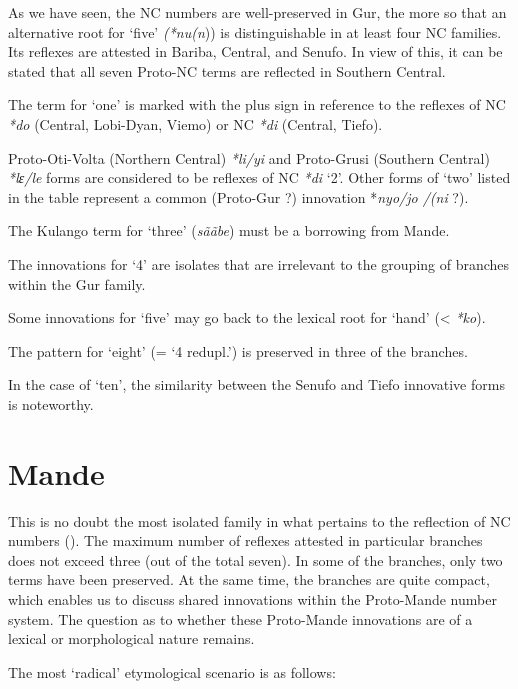 As we have seen, the NC numbers are well-preserved in Gur, the more so that an alternative root for ‘five’ \textit{(*nu}\textit{(n})) is distinguishable in at least four NC families. Its reflexes are attested in Bariba, Central, and Senufo. In view of this, it can be stated that all seven Proto-NC terms are reflected in Southern Central. 

The term for ‘one’ is marked with the plus sign in reference to the reflexes of NC \textit{*do} (Central, Lobi-Dyan, Viemo) or NC \textit{*di} (Central, Tiefo).

Proto-Oti-Volta (Northern Central) \textit{*li/yi} and Proto-Grusi (Southern Central) \textit{*lɛ/le} forms are considered to be reflexes of NC \textit{*di} ‘2’. Other forms of ‘two’ listed in the table represent a common (Proto-Gur ?) innovation  *\textit{nyo/jo /(ni} ?).

\largerpage[2]
The Kulango term for ‘three’ (\textit{s{\~{a}}{\~{a}}be}) must be a borrowing from Mande.

The innovations for ‘4’ are isolates that are irrelevant to the grouping of branches within the Gur family. 

Some innovations for ‘five’ may go back to the lexical root for ‘hand’ (< \textit{*ko}).

The pattern for ‘eight’ (= ‘4 redupl.’) is preserved in three of the branches.

In the case of ‘ten’, the similarity between the Senufo and Tiefo innovative forms is noteworthy.




\section{Mande}%

This is no doubt the most isolated family in what pertains to the reflection of NC numbers (). The maximum number of reflexes attested in particular branches does not exceed three (out of the total seven). In some of the branches, only two terms have been preserved. At the same time, the branches are quite compact, which enables us to discuss shared innovations within the Proto-Mande number system. The question as to whether these Proto-Mande innovations are of a lexical or morphological nature remains.

The most ‘radical’ etymological scenario is as follows:

